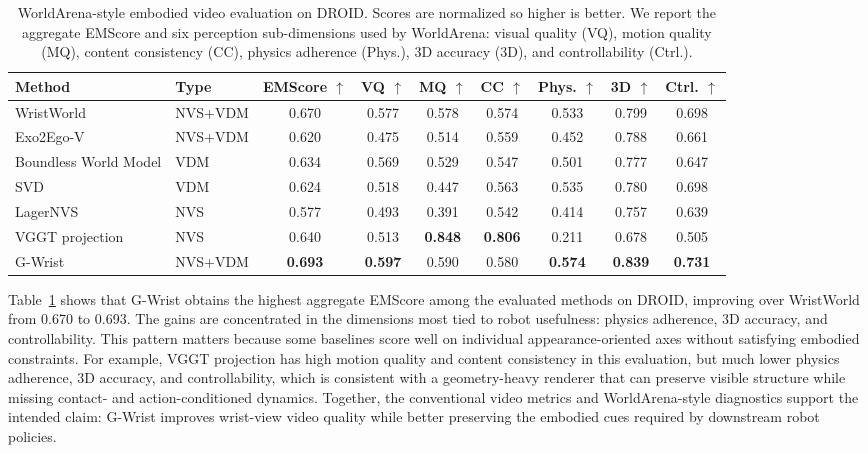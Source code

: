 \documentclass[letterpaper]{article}
\newcommand{\method}{G-Wrist}
\begin{document}
\begin{table}[t]
\caption{WorldArena-style embodied video evaluation on DROID. Scores are normalized so higher is better. We report the aggregate EMScore and six perception sub-dimensions used by WorldArena: visual quality (VQ), motion quality (MQ), content consistency (CC), physics adherence (Phys.), 3D accuracy (3D), and controllability (Ctrl.).}
\label{tab:worldarena}
\centering
\scriptsize
\setlength{\tabcolsep}{4pt}
\begin{tabular}{llccccccc}
\toprule
Method & Type & EMScore $\uparrow$ & VQ $\uparrow$ & MQ $\uparrow$ & CC $\uparrow$ & Phys. $\uparrow$ & 3D $\uparrow$ & Ctrl. $\uparrow$ \\
\midrule
WristWorld \cite{qian2025wristworld} & NVS+VDM & 0.670 & 0.577 & 0.578 & 0.574 & 0.533 & 0.799 & 0.698 \\
Exo2Ego-V \cite{liu2024exo2ego} & NVS+VDM & 0.620 & 0.475 & 0.514 & 0.559 & 0.452 & 0.788 & 0.661 \\
Boundless World Model & VDM & 0.634 & 0.569 & 0.529 & 0.547 & 0.501 & 0.777 & 0.647 \\
SVD \cite{blattmann2023svd} & VDM & 0.624 & 0.518 & 0.447 & 0.563 & 0.535 & 0.780 & 0.698 \\
LagerNVS \cite{szymanowicz2026lagernvs} & NVS & 0.577 & 0.493 & 0.391 & 0.542 & 0.414 & 0.757 & 0.639 \\
VGGT projection \cite{wang2025vggt} & NVS & 0.640 & 0.513 & \textbf{0.848} & \textbf{0.806} & 0.211 & 0.678 & 0.505 \\
\method{} & NVS+VDM & \textbf{0.693} & \textbf{0.597} & 0.590 & 0.580 & \textbf{0.574} & \textbf{0.839} & \textbf{0.731} \\
\bottomrule
\end{tabular}
\end{table}

Table~\ref{tab:worldarena} shows that \method{} obtains the highest aggregate EMScore among the evaluated methods on DROID, improving over WristWorld from 0.670 to 0.693.
The gains are concentrated in the dimensions most tied to robot usefulness: physics adherence, 3D accuracy, and controllability.
This pattern matters because some baselines score well on individual appearance-oriented axes without satisfying embodied constraints.
For example, VGGT projection has high motion quality and content consistency in this evaluation, but much lower physics adherence, 3D accuracy, and controllability, which is consistent with a geometry-heavy renderer that can preserve visible structure while missing contact- and action-conditioned dynamics.
Together, the conventional video metrics and WorldArena-style diagnostics support the intended claim: \method{} improves wrist-view video quality while better preserving the embodied cues required by downstream robot policies.
\end{document}

